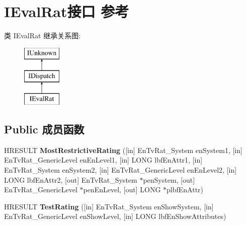 \hypertarget{interface_i_eval_rat}{}\section{I\+Eval\+Rat接口 参考}
\label{interface_i_eval_rat}
类 I\+Eval\+Rat 继承关系图\+:\begin{figure}[H]
\begin{center}
\leavevmode
\includegraphics[height=3.000000cm]{interface_i_eval_rat}
\end{center}
\end{figure}
\subsection*{Public 成员函数}
\begin{DoxyCompactItemize}
\item 
\mbox{\label{interface_i_eval_rat_a8c5870cd30274d84d44357119f19928f}} 
H\+R\+E\+S\+U\+LT {\bfseries Most\+Restrictive\+Rating} (\mbox{[}in\mbox{]} En\+Tv\+Rat\+\_\+\+System en\+System1, \mbox{[}in\mbox{]} En\+Tv\+Rat\+\_\+\+Generic\+Level en\+En\+Level1, \mbox{[}in\mbox{]} L\+O\+NG lbf\+En\+Attr1, \mbox{[}in\mbox{]} En\+Tv\+Rat\+\_\+\+System en\+System2, \mbox{[}in\mbox{]} En\+Tv\+Rat\+\_\+\+Generic\+Level en\+En\+Level2, \mbox{[}in\mbox{]} L\+O\+NG lbf\+En\+Attr2, \mbox{[}out\mbox{]} En\+Tv\+Rat\+\_\+\+System $\ast$pen\+System, \mbox{[}out\mbox{]} En\+Tv\+Rat\+\_\+\+Generic\+Level $\ast$pen\+En\+Level, \mbox{[}out\mbox{]} L\+O\+NG $\ast$plbf\+En\+Attr)
\item 
\mbox{\label{interface_i_eval_rat_abf8d27cb3da57cf47a95255af34e8e83}} 
H\+R\+E\+S\+U\+LT {\bfseries Test\+Rating} (\mbox{[}in\mbox{]} En\+Tv\+Rat\+\_\+\+System en\+Show\+System, \mbox{[}in\mbox{]} En\+Tv\+Rat\+\_\+\+Generic\+Level en\+Show\+Level, \mbox{[}in\mbox{]} L\+O\+NG lbf\+En\+Show\+Attributes)
\end{DoxyCompactItemize}
